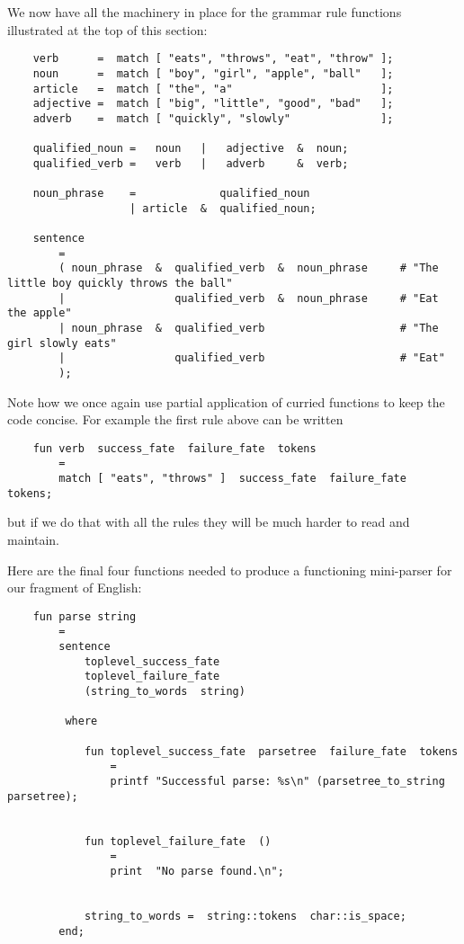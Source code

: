 We now have all the machinery in place for the grammar rule 
functions illustrated at the top of this section:

\begin{verbatim}
    verb      =  match [ "eats", "throws", "eat", "throw" ];
    noun      =  match [ "boy", "girl", "apple", "ball"   ];
    article   =  match [ "the", "a"                       ];
    adjective =  match [ "big", "little", "good", "bad"   ];
    adverb    =  match [ "quickly", "slowly"              ];

    qualified_noun =   noun   |   adjective  &  noun;
    qualified_verb =   verb   |   adverb     &  verb;

    noun_phrase    =             qualified_noun
                   | article  &  qualified_noun;

    sentence
        =
        ( noun_phrase  &  qualified_verb  &  noun_phrase     # "The little boy quickly throws the ball"
        |                 qualified_verb  &  noun_phrase     # "Eat the apple"
        | noun_phrase  &  qualified_verb                     # "The girl slowly eats"
        |                 qualified_verb                     # "Eat"
        );
\end{verbatim}

Note how we once again use partial application of curried functions 
to keep the code concise.  For example the first rule above can 
be written

\begin{verbatim}
    fun verb  success_fate  failure_fate  tokens
        =
        match [ "eats", "throws" ]  success_fate  failure_fate  tokens;
\end{verbatim}

but if we do that with all the rules they will be much 
harder to read and maintain.

Here are the final four functions needed to produce a functioning 
mini-parser for our fragment of English:

\begin{verbatim}
    fun parse string
        =
        sentence
            toplevel_success_fate
            toplevel_failure_fate
            (string_to_words  string)

         where

            fun toplevel_success_fate  parsetree  failure_fate  tokens
                =
                printf "Successful parse: %s\n" (parsetree_to_string  parsetree);


            fun toplevel_failure_fate  ()
                =
                print  "No parse found.\n";


            string_to_words =  string::tokens  char::is_space;
        end;
\end{verbatim}

